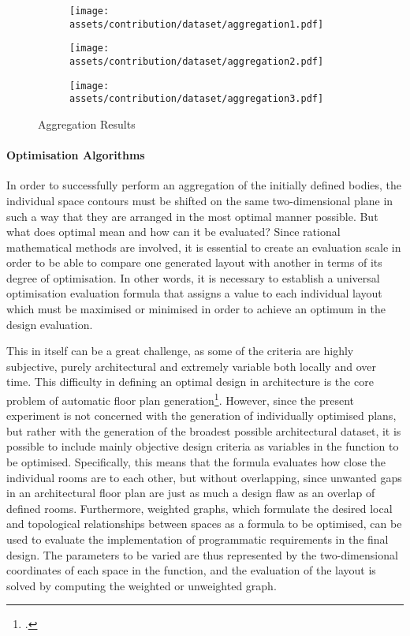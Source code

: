 \documentclass[a4paper, 12pt]{report}
\begin{document}
\begin{figure}
\centering
\begin{subfigure}{.35\textwidth}
\centering
\texttt{[image: assets/contribution/dataset/aggregation1.pdf]}
\label{fig:aggregation-1}
\end{subfigure}%
\begin{subfigure}{.39\textwidth}
\centering
\texttt{[image: assets/contribution/dataset/aggregation2.pdf]}
\label{fig:aggregation-2}
\end{subfigure}%
\begin{subfigure}{.26\textwidth}
\centering
\texttt{[image: assets/contribution/dataset/aggregation3.pdf]}
\label{fig:aggregation-3}
\end{subfigure}
\caption{Aggregation Results}
\label{fig:aggregation-results}
\end{figure}

\paragraph{Optimisation Algorithms}\label{par:optimisation-algorithms}

In order to successfully perform an aggregation of the initially defined bodies, the individual space contours must be shifted on the same two-dimensional plane in such a way that they are arranged in the most optimal manner possible. But what does optimal mean and how can it be evaluated? Since rational mathematical methods are involved, it is essential to create an evaluation scale in order to be able to compare one generated layout with another in terms of its degree of optimisation. In other words, it is necessary to establish a universal optimisation evaluation formula that assigns a value to each individual layout which must be maximised or minimised in order to achieve an optimum in the design evaluation.

This in itself can be a great challenge, as some of the criteria are highly subjective, purely architectural and extremely variable both locally and over time. This difficulty in defining an optimal design in architecture is the core problem of automatic floor plan generation\footcite{nisztuk2019hybrid}. However, since the present experiment is not concerned with the generation of individually optimised plans, but rather with the generation of the broadest possible architectural dataset, it is possible to include mainly objective design criteria as variables in the function to be optimised. Specifically, this means that the formula evaluates how close the individual rooms are to each other, but without overlapping, since unwanted gaps in an architectural floor plan are just as much a design flaw as an overlap of defined rooms. Furthermore, weighted graphs, which formulate the desired local and topological relationships between spaces as a formula to be optimised, can be used to evaluate the implementation of programmatic requirements in the final design. The parameters to be varied are thus represented by the two-dimensional coordinates of each space in the function, and the evaluation of the layout is solved by computing the weighted or unweighted graph.
\end{document}
